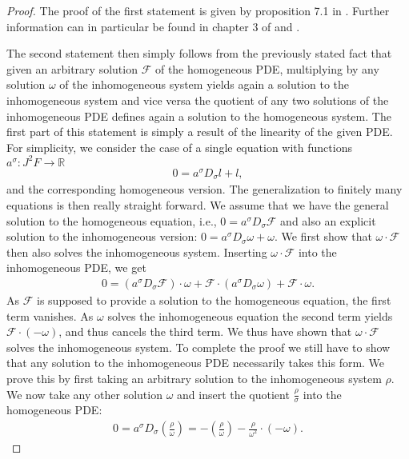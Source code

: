 \begin{proof}
The proof of the first statement is given by proposition 7.1 in \cite{seiler1994analysis}. Further information can in particular be found in chapter 3 of \cite{seiler2009involution} and \cite{articleCH}. 

The second statement then simply follows from the previously stated fact that given an arbitrary solution $\mathcal{F}$ of the homogeneous PDE, multiplying by any solution $\omega$ of the inhomogeneous system yields again a solution to the inhomogeneous system and vice versa the quotient of any two solutions of the inhomogeneous PDE defines again a solution to the homogeneous system. The first part of this statement is simply a result of the linearity of the given PDE. For simplicity, we consider the case of a single equation with functions $a^{\sigma} : J^2F \rightarrow \mathbb{R}$
\begin{align}
    0=a^{\sigma}D_{\sigma} l + l,
\end{align}
and the corresponding homogeneous version. The generalization to finitely many equations is then really straight forward. 
We assume that we have the general solution to the homogeneous equation, i.e., $0 = a^{\sigma}D_{\sigma} \mathcal{F}$ and also an explicit solution to the inhomogeneous version: $0 = a^{\sigma}D_{\sigma} \omega + \omega$.
We first show that $\omega \cdot \mathcal{F}$ then also solves the inhomogeneous system. Inserting $\omega \cdot \mathcal{F}$ into the inhomogeneous PDE, we get
\begin{align}
    0 = \left ( a^{\sigma}D_{\sigma} \mathcal{F} \right ) \cdot \omega + \mathcal{F} \cdot \left (a^{\sigma} D_{\sigma} \omega \right) + \mathcal{F} \cdot \omega. 
\end{align}
As $\mathcal{F}$ is supposed to provide a solution to the homogeneous equation, the first term vanishes. As $\omega$ solves the inhomogeneous equation the second term yields $\mathcal{F} \cdot \left ( - \omega \right )$,
and thus cancels the third term. We thus have shown that $\omega \cdot \mathcal{F}$ solves the inhomogeneous system. To complete the proof we still have to show that any solution to the inhomogeneous PDE necessarily takes this form. We prove this by first taking an arbitrary solution to the inhomogeneous system $\rho$. We now take any other solution $\omega$ and insert the quotient $ \displaystyle \frac{\rho}{\sigma}$ into the homogeneous PDE:
\begin{align}
    0 = a^{\sigma}D_{\sigma} \left (\frac{\rho}{\omega} \right) = - (\frac{\rho}{\omega}) - \frac{\rho}{\omega^2} \cdot (-\omega).

\end{align}
\end{proof}
